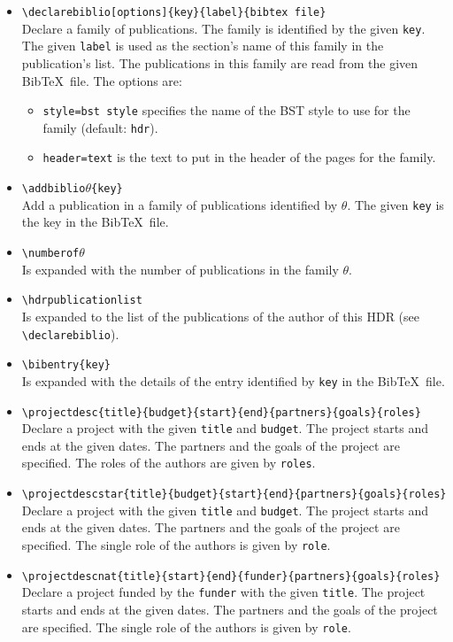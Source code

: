 \documentclass[english]{spimufchdr}
\begin{document}
\begin{itemize}
\item \texttt{{\textbackslash}declarebiblio[options]\{key\}\{label\}\{bibtex file\}} \\
	Declare a family of publications. The family is identified by the given \texttt{key}. The given \texttt{label} is used as the section's name of this family in the publication's list. The publications in this family are read from the given Bib\TeX\ file. The options are: 
	\begin{itemize}
	\item \texttt{style=bst style} specifies the name of the BST style to use for the family (default: \texttt{hdr}).
	\item \texttt{header=text} is the text to put in the header of the pages for the family.
	\end{itemize}
\item \texttt{{\textbackslash}addbiblio\ensuremath{\theta}\{key\}} \\
	Add a publication in a family of publications identified by $\theta$. The given \texttt{key} is the key in the Bib\TeX\ file.
\item \texttt{{\textbackslash}numberof\ensuremath{\theta}} \\
	Is expanded with the number of publications in the family $\theta$.
\item \texttt{{\textbackslash}hdrpublicationlist} \\
	Is expanded to the list of the publications of the author of this HDR (see \texttt{{\textbackslash}declarebiblio}).
\item \texttt{{\textbackslash}bibentry\{key\}} \\
	Is expanded with the details of the entry identified by \texttt{key} in the Bib\TeX\ file.
\item \texttt{{\textbackslash}projectdesc\{title\}\{budget\}\{start\}\{end\}\{partners\}\{goals\}\{roles\}} \\
	Declare a project with the given \texttt{title} and \texttt{budget}. The project starts and ends at the given dates. The partners and the goals of the project are specified. The roles of the authors are given by \texttt{roles}.
\item \texttt{{\textbackslash}projectdescstar\{title\}\{budget\}\{start\}\{end\}\{partners\}\{goals\}\{roles\}} \\
	Declare a project with the given \texttt{title} and \texttt{budget}. The project starts and ends at the given dates. The partners and the goals of the project are specified. The single role of the authors is given by \texttt{role}.
\item \texttt{{\textbackslash}projectdescnat\{title\}\{start\}\{end\}\{funder\}\{partners\}\{goals\}\{roles\}} \\
	Declare a project funded by the \texttt{funder} with the given \texttt{title}. The project starts and ends at the given dates. The partners and the goals of the project are specified. The single role of the authors is given by \texttt{role}.
\end{itemize}
\end{document}
